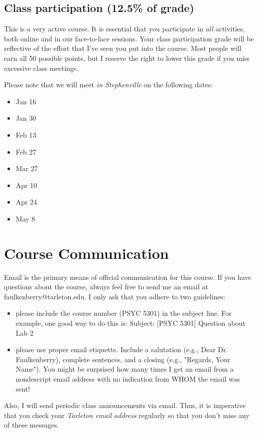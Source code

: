 \documentclass[10pt]{article}
\begin{document}
\subsection*{Class participation (12.5\% of grade)}
\label{sec-5-5}
This is a very active course.  It is essential that you participate in \emph{all} activities, both online and in our face-to-face sessions.  Your class participation grade will be reflective of the effort that I've seen you put into the course. Most people will earn all 50 possible points, but I reserve the right to lower this grade if you miss excessive class meetings. 

Please note that we will meet \emph{in Stephenville} on the following dates:
\begin{itemize}
\item Jan 16
\item Jan 30
\item Feb 13
\item Feb 27
\item Mar 27
\item Apr 10
\item Apr 24
\item May 8
\end{itemize}


\section*{Course Communication}
\label{sec-6}

Email is the primary means of official communication for this course.  If you have questions about the course, always feel free to send me an email at faulkenberry@tarleton.edu.  I only ask that you adhere to two guidelines:
\begin{itemize}
\item please include the course number (PSYC 5301) in the subject line.  For example, one good way to do this is:  Subject: [PSYC 5301] Question about Lab 2
\item please use proper email etiquette.  Include a salutation (e.g., Dear Dr. Faulkenberry), complete sentences, and a closing (e.g., "Regards, Your Name").  You might be surprised how many times I get an email from a nondescript email address with no indication from WHOM the email was sent!
\end{itemize}

Also, I will send periodic class announcements via email.  Thus, it is imperative that you check your \emph{Tarleton email address} regularly so that you don't miss any of these messages.
\end{document}
